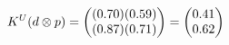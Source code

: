 \documentclass[preview]{standalone}
\begin{document}
\begin{align*}
\special{dvisvgm:raw <g id='unique000'>}K^U(d \otimes p) = \begin{pmatrix} (0.70)(0.59) \\ (0.87)(0.71) \end{pmatrix} = \begin{pmatrix} 0.41 \\ 0.62 \end{pmatrix}\special{dvisvgm:raw </g>}
\end{align*}
\end{document}
